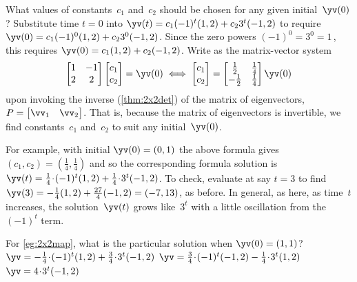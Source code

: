 \begin{example}
\begin{solution}
What values of constants~\(c_1\) and~\(c_2\) should be chosen for any given initial~\(\yv(0)\)?
Substitute time \(t=0\) into \(\yv(t)=c_1(-1)^t(1,2)+c_23^t(-1,2)\) to require \(\yv(0)=c_1(-1)^0(1,2)+c_23^0(-1,2)\).
Since the zero powers \((-1)^0=3^0=1\)\,, this requires \(\yv(0)=c_1(1,2)+c_2(-1,2)\).
Write as the matrix-vector system
\begin{equation*}
\begin{bmatrix} 1&-1\\2&2 \end{bmatrix}
\begin{bmatrix} c_1\\c_2 \end{bmatrix}
=\yv(0)
\iff
\begin{bmatrix} c_1\\c_2 \end{bmatrix}
=\begin{bmatrix} \frac12&\frac14\\-\frac12&\frac14 \end{bmatrix}\yv(0)
\end{equation*}
upon invoking the inverse (\autoref{thm:2x2det}) of the matrix of eigenvectors, \(P=\begin{bmatrix} \vv_1&\vv_2 \end{bmatrix}\).
That is, because the matrix of eigenvectors is invertible, we find constants~\(c_1\) and~\(c_2\) to suit any initial~\(\yv(0)\).

For example, with initial \(\yv(0)=(0,1)\) the above formula gives \((c_1,c_2)=(\frac14,\frac14)\) and so the corresponding formula solution is \(\yv(t)=\frac14\cdot(-1)^t(1,2)+\frac14\cdot3^t(-1,2)\).
To check, evaluate at say \(t=3\) to find 
\(\yv(3)=-\frac14(1,2)+\frac{27}4(-1,2)=(-7,13)\),
as before.
In general, as here, as time~\(t\) increases, the solution~\(\yv(t)\) grows like~\(3^t\) with a little oscillation from the~\((-1)^t\) term.
\end{solution}
\end{example}




\begin{activity}
For \autoref{eg:2x2map}, what is the particular solution when \(\yv(0)=(1,1)\)?
{\(\yv=-\frac14\cdot(-1)^t(1,2)+\frac34\cdot3^t(-1,2)\)}
{\(\yv=\frac34\cdot(-1)^t(-1,2)-\frac14\cdot3^t(1,2)\)}
{\(\yv=4\cdot3^t(-1,2)\)}
\end{activity}




